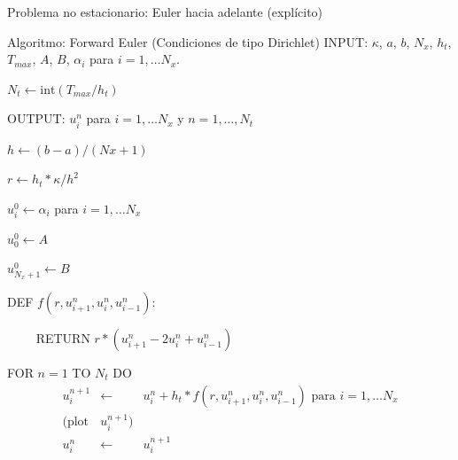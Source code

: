 \documentclass{beamer}
\begin{document}
\begin{frame}{Problema no estacionario: Euler hacia adelante (expl\'icito)}

\begin{footnotesize}
\begin{block}{Algoritmo: Forward Euler (Condiciones de tipo Dirichlet)}
INPUT: $\kappa$, $a$, $b$, $N_x$, $h_t$, $T_{max}$, $A$, $B$, $\alpha_i$ para $i=1,\dots N_x$.

$N_t \leftarrow \text{int}(T_{max} / h_t)$

OUTPUT: $u_i^n$ para $i=1,\dots N_x$ y $ n = 1, \dots, N_t$

\strut
$h \leftarrow (b-a) / (Nx+1)$

$r \leftarrow h_t * \kappa / h^2$

$u_{i}^{0} \leftarrow \alpha_{i}$ para $i=1,\dots N_x$

$u_0^{0} \leftarrow A$

$u_{N_x+1}^0 \leftarrow B$

\strut

DEF $f(r, u_{i+1}^{n}, u_{i}^{n}, u_{i-1}^{n}) : $

$\qquad$ RETURN $r * \left(u_{i+1}^{n} - 2 u_{i}^{n} + u_{i-1}^{n}\right)$

\strut

FOR $ n = 1$ TO $N_t$ DO
\begin{eqnarray*}
u_{i}^{n+1} & \leftarrow & u_{i}^{n} + h_t * f(r, u_{i+1}^{n}, u_{i}^{n}, u_{i-1}^{n}) \text{ para } 
i=1,\dots N_x \\
(\text{plot} & u_i^{n+1} ) \\
u_{i}^{n} & \leftarrow & u_{i}^{n+1}
\end{eqnarray*}
\end{block}
\end{footnotesize}

\end{frame}

\begin{frame}
\begin{center}
\end{center}
\end{frame}
\end{document}
